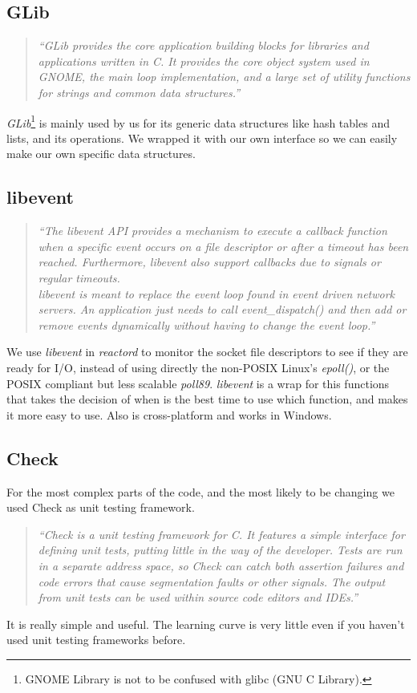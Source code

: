 \subsection{GLib}
\begin{quote}
  \emph{``GLib provides the core application building blocks for libraries and applications written in C. It provides the core object 
    system used in GNOME, the main loop implementation, and a large set of utility functions for strings and common data structures.''}
\end{quote}
\emph{GLib}\footnote{GNOME Library is not to be confused with glibc (GNU C Library).} is mainly used by us for its generic data structures 
like hash tables and lists, and its operations. We wrapped it with our own interface so we can easily make our own specific data 
structures.
\subsection{libevent}
\begin{quote}
  \emph{``The libevent API provides a mechanism to execute a callback function when a specific event occurs on a file descriptor or after 
    a timeout has been reached. Furthermore, libevent also support callbacks due to signals or regular timeouts.\\
    libevent is meant to replace the event loop found in event driven network servers. An application just needs to call event\_dispatch() 
    and then add or remove events dynamically without having to change the event loop.''}
\end{quote}
We use \emph{libevent}\cite{libevent} in \emph{reactord} to monitor the socket file descriptors to see if they are ready for I/O, instead
of using directly the non-POSIX Linux's \emph{epoll()}, or the POSIX compliant but less scalable \emph{poll89}. \emph{libevent} is a wrap 
for this functions that takes the decision of when is the best time to use which function, and makes it more easy to use. Also is 
cross-platform and works in Windows.
\subsection{Check}
For the most complex parts of the code, and the most likely to be changing we used Check\cite{check} as unit testing framework.
\begin{quote}
  \emph{``Check is a unit testing framework for C. It features a simple interface for defining unit tests, putting little in the way of 
    the developer. Tests are run in a separate address space, so Check can catch both assertion failures and code errors that cause 
    segmentation faults or other signals. The output from unit tests can be used within source code editors and IDEs.''}
\end{quote}
It is really simple and useful. The learning curve is very little even if you haven't used unit testing frameworks before.
